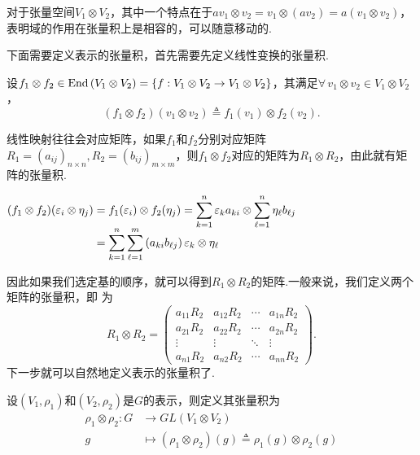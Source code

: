 对于张量空间$V_1\otimes V_2$，其中一个特点在于$av_1\otimes v_2=v_1\otimes (av_2)=a(v_1\otimes v_2)$，表明域的作用在张量积上是相容的，可以随意移动的.\par
下面需要定义表示的张量积，首先需要先定义线性变换的张量积.\par
\begin{definition}
    设$f_1\otimes f_2\in \operatorname{End}\left(V_1\otimes V_2\right)=\left\{f:V_1\otimes V_2\to V_1\otimes V_2\right\}$，其满足$\forall\, v_1\otimes v_2\in V_1\otimes V_2$，\begin{equation*}\left(f_1\otimes f_2\right)\left(v_1\otimes v_2\right)\triangleq f_1(v_1)\otimes f_2(v_2).
    \end{equation*}
\end{definition}
线性映射往往会对应矩阵，如果$f_1$和$f_2$分别对应矩阵$R_1=(a_{ij})_{n\times n},R_2=(b_{ij})_{m\times m}$，则$f_1\otimes f_2$对应的矩阵为$R_1\otimes R_2$，由此就有矩阵的张量积.\par
$\setjot[-2]\begin{aligned}[t]
    (f_1\otimes f_2)(\varepsilon_i\otimes \eta_j) &= f_1(\varepsilon_i)\otimes f_2(\eta_j)=\sum_{k=1}^n\varepsilon_ka_{ki}\otimes\sum_{\ell=1}^n\eta_\ell b_{\ell j} \\
    &=\sum_{k=1}^n\sum_{\ell=1}^m\left(a_{ki}b_{\ell j}\right)\varepsilon_k\otimes \eta_\ell
\end{aligned}$\par
因此如果我们选定基的顺序，就可以得到$R_1\otimes R_2$的矩阵.一般来说，我们定义两个矩阵的张量积，即 为\begin{equation*}R_1\otimes R_2=\begin{pmatrix}
a_{11}R_2 & a_{12}R_2 & \cdots & a_{1n}R_2 \\
a_{21}R_2 & a_{22}R_2 & \cdots & a_{2n}R_2 \\
\vdots & \vdots & \ddots & \vdots \\
a_{n1}R_2 & a_{n2}R_2 & \cdots & a_{nn}R_2
\end{pmatrix}.\end{equation*}
下一步就可以自然地定义表示的张量积了.
    \begin{definition}[表示的张量积]
    设$(V_1,\rho_1)$和$(V_2,\rho_2)$是$G$的表示，则定义其张量积为\begin{align*}
        \rho_1\otimes \rho_2:G&\to GL(V_1\otimes V_2) \\
        g&\mapsto (\rho_1\otimes\rho_2)(g)\triangleq \rho_1(g)\otimes\rho_2(g)
    \end{align*}
\end{definition}
